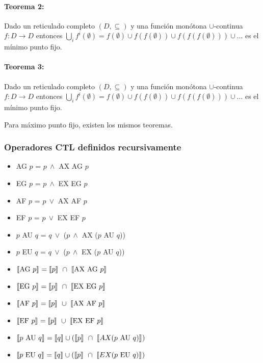 \paragraph{Teorema 2:} Dado un reticulado completo $(D,\subseteq)$ y una función monótona $\cup$-continua \\ $f:D\to D$ entonces $\bigcup_i f^i(\emptyset) = f(\emptyset)\cup f(f(\emptyset)) \cup f(f(f(\emptyset)))\cup\dots$ es el mínimo punto fijo.

\paragraph{Teorema 3:} Dado un reticulado completo $(D,\subseteq)$ y una función monótona $\cup$-continua \\ $f:D\to D$ entonces $\bigcup_i f^i(\emptyset) = f(\emptyset)\cup f(f(\emptyset)) \cup f(f(f(\emptyset)))\cup\dots$ es el mínimo punto fijo.

\vspace*{0.5cm}
Para máximo punto fijo, existen los mismos teoremas.
\subsubsection{Operadores CTL definidos recursivamente}
\begin{multicols}{2}
\begin{itemize}

\item AG $p$ = $p~\land$ AX AG $p$
\item EG $p$ = $p~\land$ EX EG $p$
\item AF $p$ = $p~\lor$  AX AF $p$
\item EF $p$ = $p~\lor$  EX EF $p$
\item $p$ AU $q$ = $q~\lor$ ($p~\land$ AX ($p$ AU $q$))
\item $p$ EU $q$ = $q~\lor$ ($p~\land$ EX ($p$ AU $q$))

\item $\llbracket \text{AG } p \rrbracket_{} =\llbracket p \rrbracket_{}~\cap~\llbracket \text{AX AG }p \rrbracket_{}$
\item $\llbracket \text{EG } p \rrbracket_{} =\llbracket p \rrbracket_{}~\cap~\llbracket \text{EX EG }p \rrbracket_{}$
\item $\llbracket \text{AF } p \rrbracket_{} =\llbracket p \rrbracket_{}~\cup~\llbracket \text{AX AF }p \rrbracket_{}$
\item $\llbracket \text{EF } p \rrbracket_{} =\llbracket p \rrbracket_{}~\cup~\llbracket \text{EX EF }p \rrbracket_{}$
\item $\llbracket p\text{ AU } q \rrbracket_{} =\llbracket q \rrbracket_{} \cup (\llbracket p \rrbracket_{}~\cap~\llbracket AX(p\text{ AU } q) \rrbracket_{})$
\item $\llbracket p\text{ EU } q \rrbracket_{} =\llbracket q \rrbracket_{} \cup (\llbracket p \rrbracket_{}~\cap~\llbracket EX(p\text{ EU } q) \rrbracket_{})$

\end{itemize}

\end{multicols}

